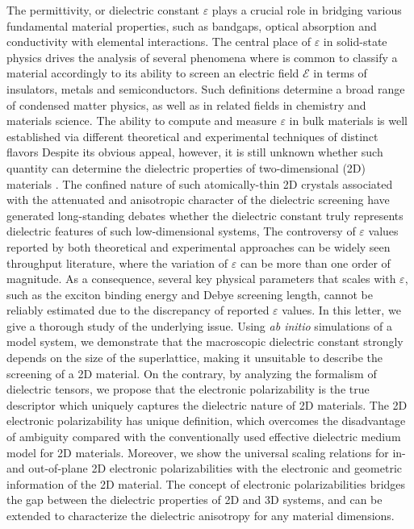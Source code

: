 The permittivity, or dielectric constant $\varepsilon$ plays a crucial
role in bridging various fundamental material properties, such as
bandgaps\cite{Moss_1950_relation,Moss_1985_n_Eg}, optical
absorption\cite{Kittel_2005_introduction_book} and
conductivity\cite{Dressel_2001_electrodynamics} with elemental
interactions.  The central place of $\varepsilon$ in solid-state
physics drives the analysis of several phenomena where is common to
classify a material accordingly to its ability to screen an electric
field $\mathscr{E}$ in terms of insulators, metals and
semiconductors. Such definitions determine a broad range of condensed
matter physics, as well as in related fields in chemistry and
materials science.  The ability to compute and measure $\varepsilon$
in bulk materials is well established via different theoretical
\cite{Adler_1962_eps,Hybertsen_1987} and experimental techniques
\cite{Palik_1998_handbook} of distinct flavors
%
Despite its obvious appeal, however, it is still unknown whether such quantity can determine the 
dielectric properties of two-dimensional (2D) materials \cite{Novoselov_2016_vdW}.  
%
The confined nature of such atomically-thin 2D crystals associated
with the attenuated and anisotropic character of the dielectric
screening
\cite{Keldysh_1979_eps_multi,Sharma_1985_semiconductor_slab_eps,Low_2014_screening_BP,Cudazzo_2011_screening_2D,Bechstedt_2012_silicene,Cudazzo_2010_screen2D,Nazarov_2015_2D_3D}
have generated long-standing debates whether the dielectric constant
truly represents dielectric features of such low-dimensional systems,
The controversy of $\varepsilon$ values reported by both theoretical
and experimental approaches can be widely seen throughput
literature\cite{Li_2016_screening_rev}, where the variation of
$\varepsilon$ can be more than one order of magnitude.
%
As a
consequence, several key physical parameters that scales with
$\varepsilon$, such as the exciton binding energy and Debye screening
length, cannot be reliably estimated due to the discrepancy of
reported $\varepsilon$ values. In this letter, we give a thorough
study of the underlying issue. Using \textit{ab initio} simulations of
a model system, we demonstrate that the macroscopic dielectric
constant strongly depends on the size of the superlattice, making it
unsuitable to describe the screening of a 2D material. On the
contrary, by analyzing the formalism of dielectric tensors, we propose
that the electronic polarizability is the true descriptor which
uniquely captures the dielectric nature of 2D materials. The 2D
electronic polarizability has unique definition, which overcomes the
disadvantage of ambiguity compared with the conventionally used
effective dielectric medium model for 2D materials. Moreover, we show
the universal scaling relations for in- and out-of-plane 2D electronic
polarizabilities with the electronic and geometric information of the
2D material. The concept of electronic polarizabilities bridges the
gap between the dielectric properties of 2D and 3D systems, and can be
extended to characterize the dielectric anisotropy for any material
dimensions.


